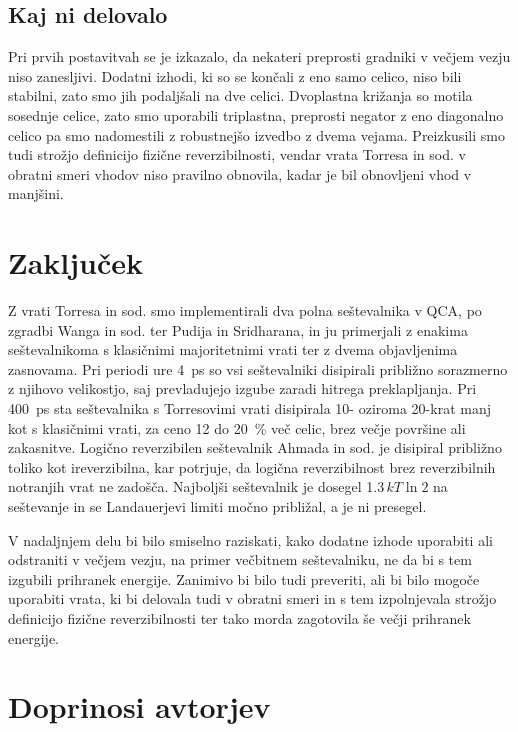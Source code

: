 \subsection{Kaj ni delovalo}
\label{g19:sec:neuspehi}

Pri prvih postavitvah se je izkazalo, da nekateri preprosti gradniki v večjem vezju niso zanesljivi. Dodatni izhodi, ki so se končali z eno samo celico, niso bili stabilni, zato smo jih podaljšali na dve celici. Dvoplastna križanja so motila sosednje celice, zato smo uporabili triplastna, preprosti negator z eno diagonalno celico pa smo nadomestili z robustnejšo izvedbo z dvema vejama. Preizkusili smo tudi strožjo definicijo fizične reverzibilnosti, vendar vrata Torresa in sod. v obratni smeri vhodov niso pravilno obnovila, kadar je bil obnovljeni vhod v manjšini.

\section{Zaključek}
\label{g19:sec:zakljucek}

Z vrati Torresa in sod. smo implementirali dva polna seštevalnika v QCA, po zgradbi Wanga in sod. ter Pudija in Sridharana, in ju primerjali z enakima seštevalnikoma s klasičnimi majoritetnimi vrati ter z dvema objavljenima zasnovama. Pri periodi ure \SI{4}{ps} so vsi seštevalniki disipirali približno sorazmerno z njihovo velikostjo, saj prevladujejo izgube zaradi hitrega preklapljanja. Pri \SI{400}{ps} sta seštevalnika s Torresovimi vrati disipirala \num{10}- oziroma \num{20}-krat manj kot s klasičnimi vrati, za ceno \num{12} do \SI{20}{\percent} več celic, brez večje površine ali zakasnitve. Logično reverzibilen seštevalnik Ahmada in sod. je disipiral približno toliko kot ireverzibilna, kar potrjuje, da logična reverzibilnost brez reverzibilnih notranjih vrat ne zadošča. Najboljši seštevalnik je dosegel \num{1.3}\,$kT\ln 2$ na seštevanje in se Landauerjevi limiti močno približal, a je ni presegel.

V nadaljnjem delu bi bilo smiselno raziskati, kako dodatne izhode uporabiti ali odstraniti v večjem vezju, na primer večbitnem seštevalniku, ne da bi s tem izgubili prihranek energije. Zanimivo bi bilo tudi preveriti, ali bi bilo mogoče uporabiti vrata, ki bi delovala tudi v obratni smeri in s tem izpolnjevala strožjo definicijo fizične reverzibilnosti ter tako morda zagotovila še večji prihranek energije.

\section*{Doprinosi avtorjev}

